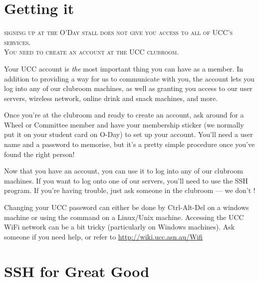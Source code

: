 \label{SetupAccount}



\section{Getting it}

\textsc{signing up at the O'Day stall does not give you access to all of UCC's services.  \\ \noindent You need to create an account at the UCC clubroom.}

Your UCC account is \emph{the} most important thing you can have as a member. In addition to providing a way for us to communicate with you, the account lets you log into any of our clubroom machines, as well as granting you access to our user servers, wireless network, online drink and snack machines, and more.

Once you're at the clubroom and ready to create an account, ask around for a Wheel or Committee member and have your membership sticker (we normally put it on your student card on O-Day) to set up your account. You'll need a user name and a password to memorise, but it's a pretty simple procedure once you've found the right person!


Now that you have an account, you can use it to log into any of our clubroom machines. If you want to log onto one of our servers, you'll need to use the SSH program. If you're having trouble, just ask someone in the clubroom --- we don't !

Changing your UCC password can either be done by Ctrl-Alt-Del on a windows machine or using the command  on a Linux/Unix machine.
Accessing the UCC WiFi network can be a bit tricky (particularly on Windows machines). Ask someone if you need help, or refer to \url{http://wiki.ucc.asn.au/Wifi}




\section{SSH for Great Good}

